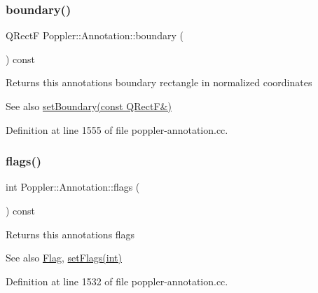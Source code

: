 \mbox{\label{class_poppler_1_1_annotation_a659d9288f67ff988f75df0fa9d3ca2fb}} 
\subsubsection{\texorpdfstring{boundary()}{boundary()}}
{\footnotesize\ttfamily Q\+RectF Poppler\+::\+Annotation\+::boundary (\begin{DoxyParamCaption}{ }\end{DoxyParamCaption}) const}

Returns this annotation\textquotesingle{}s boundary rectangle in normalized coordinates

\begin{DoxySeeAlso}{See also}
\hyperlink{class_poppler_1_1_annotation_ad7632d611ff26ec76cc42d301d2296e9}{set\+Boundary(const Q\+Rect\+F\&)} 
\end{DoxySeeAlso}


Definition at line 1555 of file poppler-\/annotation.\+cc.

\mbox{\label{class_poppler_1_1_annotation_a34a97344409f4ebb1fa9e26d5bc19c71}} 
\subsubsection{\texorpdfstring{flags()}{flags()}}
{\footnotesize\ttfamily int Poppler\+::\+Annotation\+::flags (\begin{DoxyParamCaption}{ }\end{DoxyParamCaption}) const}

Returns this annotation\textquotesingle{}s flags

\begin{DoxySeeAlso}{See also}
\hyperlink{class_poppler_1_1_annotation_a8c2dca956649e4ce454361d5b75dc270}{Flag}, \hyperlink{class_poppler_1_1_annotation_abb788875ed4ed5e593e979afc70555db}{set\+Flags(int)} 
\end{DoxySeeAlso}


Definition at line 1532 of file poppler-\/annotation.\+cc.

\mbox{\label{class_poppler_1_1_annotation_a6db96f04d0f70ceb167e2be0a8e3887f}} 
